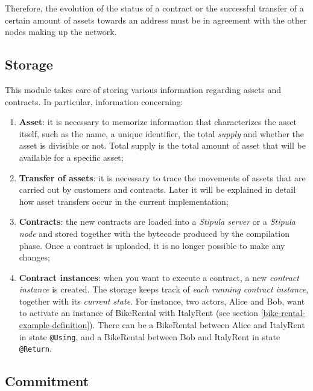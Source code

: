 Therefore, the evolution of the status of a contract or the successful transfer of a certain amount of 
assets towards an address must be in agreement with the other nodes making up the network.

\subsection{Storage}
\label{storage-module}

This module takes care of storing various information regarding assets and contracts. In particular, 
information concerning:
\begin{enumerate}
	\item \textbf{Asset}: it is necessary to memorize information that characterizes the asset itself, such 
	as the name, a unique identifier, the total \textit{supply} and whether the asset is divisible or not. 
	Total supply is the total amount of asset that will be available for a specific asset;
	\item \textbf{Transfer of assets}: it is necessary to trace the movements of assets that are carried out 
	by customers and contracts. Later it will be explained in detail how asset transfers occur in the current 
	implementation;
	\item \textbf{Contracts}: the new contracts are loaded into a \textit{Stipula server} or a 
	\textit{Stipula node} and stored together with the bytecode produced by the compilation phase. Once a 
	contract is uploaded, it is no longer possible to make any changes;
	\item \textbf{Contract instances}: when you want to execute a contract, a new \textit{contract instance} 
	is created. The storage keeps track of \textit{each running contract instance}, together with its 
	\textit{current state}. For instance, two actors, Alice and Bob, want to activate an instance of BikeRental 
	with ItalyRent (see section \ref{bike-rental-example-definition}). There can be a BikeRental between Alice 
	and ItalyRent in state \verb|@Using|, and a BikeRental between Bob and ItalyRent in state \verb|@Return|.
\end{enumerate}

\subsection{Commitment}
\label{commitment-module}

